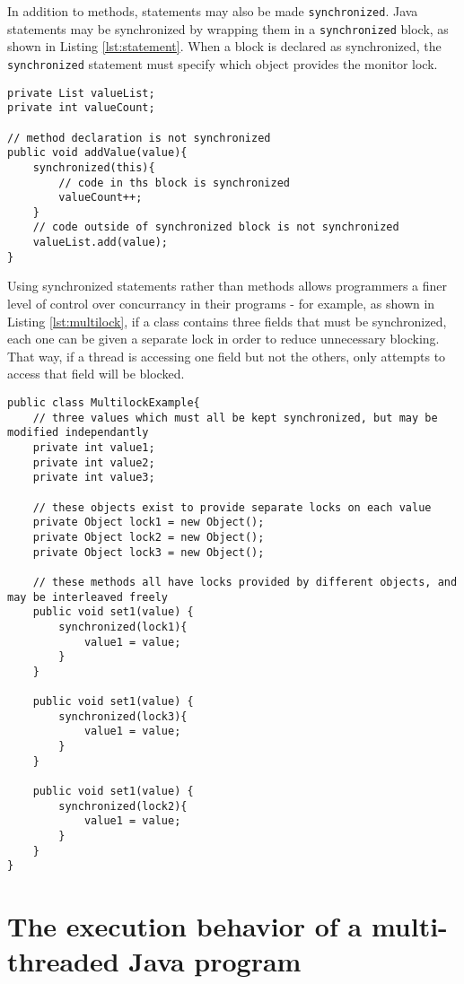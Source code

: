 \documentclass[12pt,a4paper]{article}
\begin{document}
	In addition to methods, statements may also be made \texttt{synchronized}. Java statements may be synchronized by wrapping them in a \texttt{synchronized} block, as shown in Listing \ref{lst:statement}. When a block is declared as synchronized, the \texttt{synchronized} statement must specify which object provides the monitor lock. 

		\begin{lstlisting}[style=insetJava, caption=Example of synchronized statements., label=lst:statement]
private List valueList;
private int valueCount;

// method declaration is not synchronized
public void addValue(value){
	synchronized(this){
		// code in ths block is synchronized
		valueCount++;
	}
	// code outside of synchronized block is not synchronized
	valueList.add(value);
}
		\end{lstlisting}

		Using synchronized statements rather than methods allows programmers a finer level of control over concurrancy in their programs - for example, as shown in Listing \ref{lst:multilock}, if a class contains three fields that must be synchronized, each one can be given a separate lock in order to reduce unnecessary blocking. That way, if a thread is accessing one field but not the others, only attempts to access that field will be blocked.

		\begin{lstlisting}[style=insetJava, caption=Example of the use of multiple locks to reduce unneeded blocking., label=lst:multilock]
public class MultilockExample{
	// three values which must all be kept synchronized, but may be modified independantly
	private int value1;
	private int value2;
	private int value3;

	// these objects exist to provide separate locks on each value
	private Object lock1 = new Object();
	private Object lock2 = new Object();
	private Object lock3 = new Object();

	// these methods all have locks provided by different objects, and may be interleaved freely
	public void set1(value) {
		synchronized(lock1){
			value1 = value;
		}
	}

	public void set1(value) {
		synchronized(lock3){
			value1 = value;
		}
	}

	public void set1(value) {
		synchronized(lock2){
			value1 = value;
		}
	}
}
		\end{lstlisting}

  \section{The execution behavior of a multi-threaded Java program}
\end{document}

